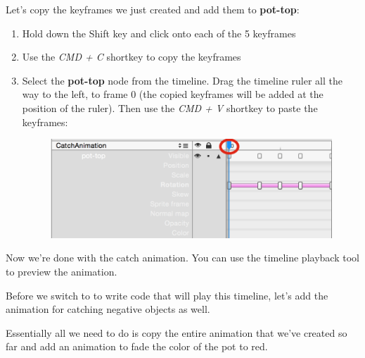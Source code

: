 \begin{leftbar}
Let's copy the keyframes we just created and add them to \textbf{pot-top}:
\begin{enumerate}
  \item Hold down the Shift key and click onto each of the 5 keyframes
  \item Use the \textit{CMD + C} shortkey to copy the keyframes
  \item Select the \textbf{pot-top} node from the timeline. Drag the timeline
  ruler all the way to the left, to frame 0 (the copied keyframes will be added
  at the position of the ruler). Then use the \textit{CMD + V} shortkey to paste
  the keyframes:
  \begin{figure}[H]
  \centering
  \includegraphics[width=300pt]{images/Chapter9/copy_keyframes.png}
  \end{figure}
\end{enumerate}
\end{leftbar}

Now we're done with the catch animation. You can use the timeline playback tool
to preview the animation.

Before we switch to \xcode{} to write code that will play this timeline, let's add the animation for catching negative objects as well.

Essentially all we need to do is copy the entire animation that we've created so
far and add an animation to fade the color of the pot to red.

